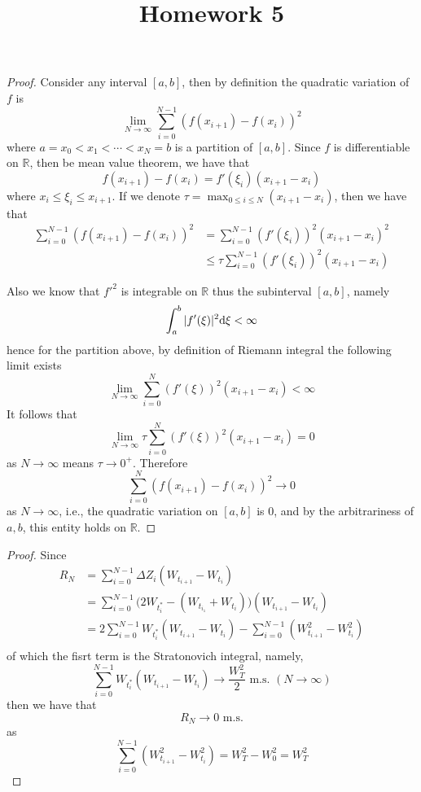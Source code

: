 \documentclass{homework}
\title{Homework 5}
\begin{document}
    \maketitle

    \problem
    \begin{proof}
        Consider any interval $[a,b]$, then by definition the
        quadratic variation of $f$ is
        \[\lim_{N\to\infty}\sum_{i=0}^{N-1} (f(x_{i+1})-f(x_i))^2\]
        where $a=x_0<x_1<\cdots<x_N=b$ is a partition of $[a,b]$.
        Since $f$ is differentiable on $\mathbb R$, then be mean
        value theorem, we have that
        \[f(x_{i+1})-f(x_i)=f'(\xi_i)(x_{i+1}-x_i)\]
        where $x_i\leq \xi_i\leq x_{i+1}$.
        If we denote $\tau=\max_{0\leq i\leq N}(x_{i+1}-x_i)$,
        then we have that
        \[\begin{aligned}
            \sum_{i=0}^{N-1}(f(x_{i+1})-f(x_i))^2
            &=\sum_{i=0}^{N-1}(f'(\xi_i))^2(x_{i+1}-x_i)^2\\
            &\leq\tau\sum_{i=0}^{N-1}(f'(\xi_i))^2(x_{i+1}-x_i)
        \end{aligned}\]

        Also we know that $f'^2$ is integrable on $\mathbb R$
        thus the subinterval $[a,b]$, namely
        \[\int_a^b|f'(\xi)|^2\mathrm d\xi<\infty\]
        hence for the partition above, by definition of Riemann
        integral the following limit exists
        \[\lim_{N\to\infty}\sum_{i=0}^N(f'(\xi))^2(x_{i+1}-x_i)
        <\infty\]
        It follows that
        \[\lim_{N\to\infty}\tau\sum_{i=0}^N(f'(\xi))^2(x_{i+1}-x_i)
        =0\]
        as $N\to\infty$ means $\tau\to 0^+$. Therefore
        \[\sum_{i=0}^N(f(x_{i+1})-f(x_i))^2\to 0\]
        as $N\to\infty$, i.e., the quadratic variation on $[a,b]$
        is 0, and by the arbitrariness of $a,b$, this entity holds
        on $\mathbb R$.
    \end{proof}

    \problem
    \begin{proof}
        Since
        \[\begin{aligned}
            R_N&=\sum_{i=0}^{N-1}\Delta Z_i(W_{t_{i+1}}-W_{t_i})\\
            &=\sum_{i=0}^{N-1}\big(2W_{t_i^*}-(W_{t_{i_1}}+W_{t_i})
              \big)(W_{t_{i+1}}-W_{t_i})\\ 
            &=2\sum_{i=0}^{N-1}W_{t^*_i}(W_{t_{i+1}}-W_{t_i})
              -\sum_{i=0}^{N-1}(W_{t_{i+1}}^2-W_{t_i}^2)\\
        \end{aligned}\]
        of which the fisrt term is the Stratonovich integral, namely,
        \[\sum_{i=0}^{N-1}W_{t_i^*}(W_{t_{i+1}}-W_{t_i})\to\frac{W_T^2}{2}
        \text{ m.s. }(N\to\infty)\]
        then we have that
        \[R_N\to 0\text{ m.s.}\]
        as
        \[\sum_{i=0}^{N-1}(W_{t_{i+1}}^2-W_{t_i}^2)=W_T^2-W_0^2=W_T^2\]
    \end{proof}
\end{document}

